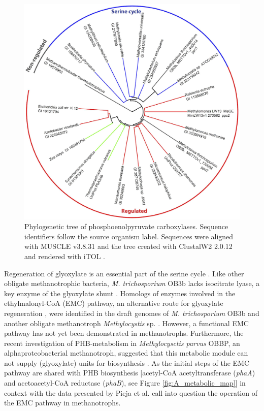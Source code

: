 \begin{figure}[H]
\centering
     \includegraphics[width=1.0\textwidth]{./tex/chapter1/figures/figure3.png}
     \begin{singlespace}
     \caption[Phylogenetic tree of phosphoenolpyruvate carboxylases]{
        Phylogenetic tree of phosphoenolpyruvate carboxylases.
        Sequence identifiers follow the source organism label. Sequences were aligned with MUSCLE v3.8.31 \cite{edgar2004} and
        the tree created with ClustalW2 2.0.12 \cite{larkin2007} and rendered with iTOL \cite{letunic2007}.}
     \label{fig:B_pep}
     \end{singlespace}
\end{figure}

Regeneration of glyoxylate is an essential part of the serine cycle \cite{anthony1982, anthony2011, peyraud2009}.
Like other obligate methanotrophic bacteria, \textit{M. trichosporium} OB3b lacks isocitrate lyase, a key enzyme of the glyoxylate shunt \cite{trotsenko2008}.
Homologs of enzymes involved in the ethylmalonyl-CoA (EMC) pathway, an alternative route for glyoxylate regeneration \cite{peyraud2009}, were identified in the draft genomes of \textit{M. trichosporium} OB3b and another obligate methanotroph \textit{Methylocystis} sp. \cite{stein2010, stein2011}.
However, a functional EMC pathway has not yet been demonstrated in methanotrophs.
Furthermore, the recent investigation of PHB-metabolism in \textit{Methylocysctis parvus} OBBP, an alphaproteobacterial methanotroph, suggested that this metabolic module can not supply  (glyoxylate) units for biosynthesis \cite{pieja2011}.
As the initial steps of the EMC pathway are shared with PHB biosynthesis [acetyl-CoA acetyltransferase (\textit{phaA}) and acetoacetyl-CoA reductase (\textit{phaB}), see Figure \ref{fig:A_metabolic_map}] in context with the data presented by Pieja et al. \cite{pieja2011} call into question the operation of the EMC pathway in methanotrophs.

